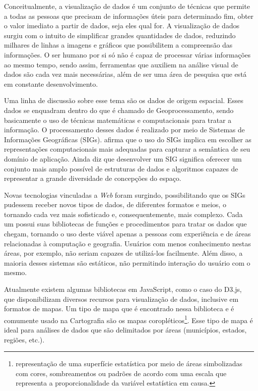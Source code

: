 \documentclass[12pt]{article}
\begin{document}
Conceitualmente, a visualização de dados é um conjunto de técnicas que permite a todas as pessoas que precisam de informações úteis para determinado fim, obter o valor imediato a partir de dados, seja eles qual for. A visualização de dados surgiu com o intuito de simplificar grandes quantidades de dados, reduzindo milhares de linhas a imagens e gráficos que possibilitem a compreensão das informações. O ser humano por si só não é capaz de processar várias informações ao mesmo tempo, sendo assim, ferramentas que auxiliem na análise visual de dados são cada vez mais necessárias, além de ser uma área de pesquisa que está em constante desenvolvimento.

Uma linha de discussão sobre esse tema são os dados de origem espacial. Esses dados se enquadram dentro do que é chamado de Geoprocessamento, sendo basicamente o uso de técnicas matemáticas e computacionais para tratar a informação. O processamento desses dados é realizado por meio de Sistemas de Informações Geográficas (SIGs). \citet{bdgeo} afirma que o uso do SIGs implica em escolher as representações computacionais mais adequadas para capturar a semântica de seu domínio de aplicação. Ainda diz que desenvolver um SIG significa oferecer um conjunto mais amplo possível de estruturas de dados e algoritmos capazes de representar a grande diversidade de concepções do espaço.

Novas tecnologias vinculadas a \emph{Web} foram surgindo, possibilitando que os SIGs pudessem receber novos tipos de dados, de diferentes formatos e meios, o tornando cada vez mais sofisticado e, consequentemente, mais complexo. Cada um possui suas bibliotecas de funções e procedimentos para tratar os dados que chegam, tornando o uso deste viável apenas a pessoas com experiência e de áreas relacionadas à computação e geografia. Usuários com menos conhecimento nestas áreas, por exemplo, não seriam capazes de utilizá-los facilmente. Além disso, a maioria desses sistemas são estáticos, não permitindo interação do usuário com o mesmo.

Atualmente existem algumas bibliotecas em JavaScript, como o caso do D3.js, que disponibilizam diversos recursos para visualização de dados, inclusive em formatos de mapas. Um tipo de mapa que é encontrado nessa biblioteca e é comumente usado na Cartografia são os mapas coropléticos\footnote{representação de uma superfície estatística por meio de áreas simbolizadas com cores, sombreamentos ou padrões de acordo com uma escala que representa a proporcionalidade da variável estatística em causa.}. Esse tipo de mapa é ideal para análises de dados que são delimitados por áreas (municípios, estados, regiões, etc.).
\end{document}
